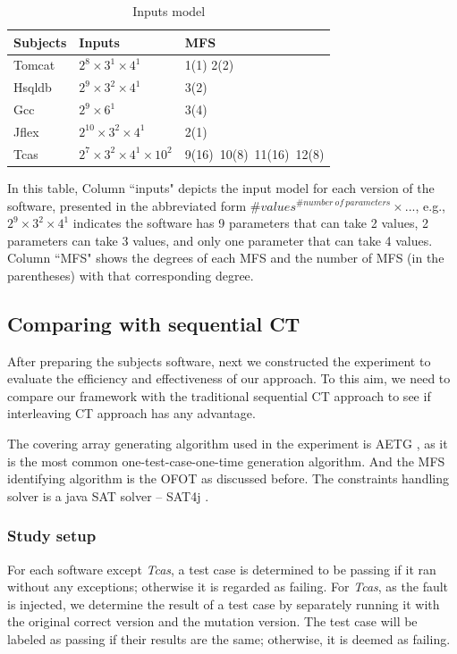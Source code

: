 \documentclass{sig-alternate}
\begin{document}
\begin{table}[ht]
\caption{Inputs model }
\label{inputs}
\center
\begin{tabular}{l|l|l}
\hline
Subjects & Inputs & MFS \\
\hline
Tomcat   &  $2^{8} \times 3^{1} \times 4^{1}$       & 1(1) 2(2)  \\
Hsqldb   &   $2^{9} \times 3^{2} \times 4^{1}$      &  3(2) \\
Gcc      &   $2^{9} \times 6^{1}$      &    3(4)  \\
Jflex    & $2^{10} \times 3^{2} \times 4^{1} $        &   2(1)   \\
Tcas     &  $2^{7} \times 3^{2} \times 4^{1} \times 10^{2} $ &9(16)\ 10(8)\ 11(16)\ 12(8) \\ \hline
\end{tabular}

\end{table}
In this table, Column ``inputs" depicts the input model for each version of the software, presented in the abbreviated form $\#values^{\#number\ of\ parameters} \times ...$, e.g., $2^{9} \times 3^{2} \times 4^{1}$ indicates the software has 9 parameters that can take 2 values, 2 parameters can take 3 values, and only one parameter that can take 4 values. Column ``MFS" shows the degrees of each MFS and the number of MFS (in the parentheses) with that corresponding degree.

\subsection{Comparing with sequential CT}

After preparing the subjects software, next we constructed the experiment to evaluate the efficiency and effectiveness of our approach. To this aim, we need to compare our framework with the traditional sequential CT approach to see if interleaving CT approach has any advantage.

The covering array generating algorithm used in the experiment is AETG \cite{cohen1997aetg}, as it is the most common one-test-case-one-time generation algorithm. And the MFS identifying algorithm is the OFOT \cite{nie2011minimal} as discussed before. The constraints handling solver is a java SAT solver -- SAT4j \cite{le2010sat4j}.


\subsubsection{Study setup}
For each software except \emph{Tcas}, a test case is determined to be passing if it ran without any exceptions; otherwise it is regarded as failing. For \emph{Tcas}, as the fault is injected, we determine the result of a test case by separately running it with the original correct version and the mutation version. The test case will be labeled as passing if their results are the same; otherwise, it is deemed as failing.
\end{document}
